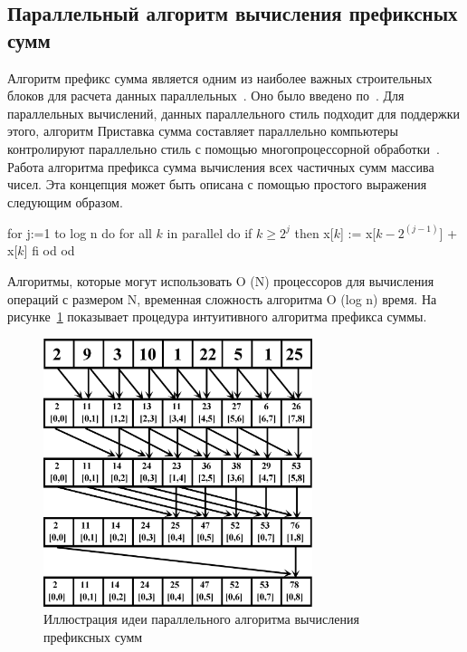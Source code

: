 \documentclass[specification,annotation]{itmo-student-thesis}
\newcommand{\revise}[1]{{\color{red!70!black} #1 }}
\begin{document}
\subsection{Параллельный алгоритм вычисления префиксных сумм}

\revise{
Алгоритм префикс сумма является одним из наиболее важных строительных блоков для расчета данных параллельных~\cite{sengupta06}. Оно было введено по~\cite{hillis86}. Для параллельных 
вычислений, данных параллельного стиль подходит для поддержки этого, алгоритм Приставка сумма составляет параллельно компьютеры контролируют параллельно стиль с помощью многопроцессорной
обработки~\cite{hillis86}. Работа алгоритма префикса сумма вычисления всех частичных сумм массива чисел. Эта концепция может быть описана с помощью простого выражения следующим образом.
}

\revise{
for j:=1 to log n do
    for all $k$ in parallel do
        if $k \ge 2^j$ then
            x[$k$] := x[$k - 2^(j-1)$] + x[$k$]
        fi
    od
od 
}

\revise{
Алгоритмы, которые могут использовать O (N) процессоров для вычисления операций с размером N, временная сложность алгоритма O (log n) время. На рисунке~\ref{fig:prefix-sum} показывает процедура 
интуитивного алгоритма префикса суммы.
}

\begin{figure}[!ht]
\centering
\includegraphics[width=0.7\textwidth]{pic/parallel-prefix-sum.png}
\caption{Иллюстрация идеи параллельного алгоритма вычисления префиксных сумм}\label{fig:prefix-sum}
\end{figure}

\chapterconclusion
\end{document}
